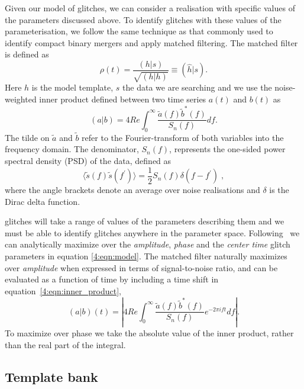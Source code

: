 Given our model of \scl{} glitches, we can consider a realisation with specific values of the parameters discussed above. To identify glitches with these values of the parameterisation, we follow the same technique as that commonly used to identify compact binary mergers and apply matched filtering. The matched filter is defined as~\cite{FINDCHIRP:2012}
%
\begin{equation}
  \rho(t) = \frac{(h | s)}{\sqrt{(h | h)}} \equiv (\hat{h} | s).
  \label{4:eqn:mf_1}
\end{equation}
%
Here $h$ is the model template, $s$ the \gw{} data we are searching and we use the noise-weighted inner product defined between two time series $a(t)$ and $b(t)$ as
%
\begin{equation}
  (a | b) = 4 Re \int^{\infty}_{0} \frac{\tilde{a}(f) \tilde{b}^*(f)}{S_n(f)} 
  df.
  \label{4:eqn:inner_product}
\end{equation}
%
The tilde on $\tilde{a}$ and $\tilde{b}$ refer to the Fourier-transform of both variables into the frequency domain. The denominator, $S_n(f)$, represents the one-sided power spectral density (PSD) of the data, defined as
%
\begin{equation}
  \langle \tilde{s}(f) \tilde{s}(f^\prime) \rangle = \frac{1}{2} S_n(f) \delta(f - f^\prime) \;,
  \label{4:eqn:psd}
\end{equation}
%
where the angle brackets denote an average over noise realisations and $\delta$ is the Dirac delta function.

\Scl{} glitches will take a range of values of the parameters describing them and we must be able to identify glitches anywhere in the parameter space. Following~\cite{FINDCHIRP:2012} we can analytically maximize over the \emph{amplitude}, \emph{phase} and the \emph{center time} glitch parameters in equation \ref{4:eqn:model}. The matched filter naturally maximizes over \emph{amplitude} when expressed in terms of signal-to-noise ratio, and can be evaluated as a function of time by including a time shift in equation~\ref{4:eqn:inner_product},
%
\begin{equation}
  (a | b)(t) = \left| 4 Re \int^{\infty}_{0} \frac{\tilde{a}(f) \tilde{b}^*(f)}{S_n(f)} 
  e^{-2 \pi i f t} 
  df \right|.
  \label{4:eqn:inner_product_time}
\end{equation}
%
To maximize over phase we take the absolute value of the inner product, rather than the real part of the integral.

\subsection{Template bank}

